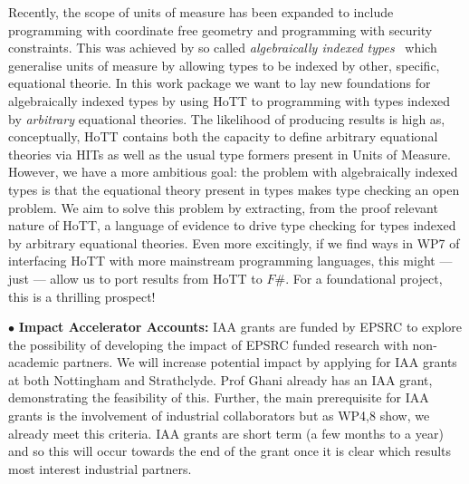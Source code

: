 \documentclass[a4paper,11pt]{article}
\begin{document}
Recently, the scope of units of measure has been expanded to include
programming with coordinate free geometry and programming with
security constraints. This was achieved by so called {\em
  algebraically indexed types}~\cite{ajk} which generalise units of
measure by allowing types to be indexed by other, specific, equational
theorie. In this work package we want to lay new foundations for
algebraically indexed types by using HoTT to programming with types
indexed by {\em arbitrary} equational theories. The likelihood of
producing results is high as, conceptually, HoTT contains both the
capacity to define arbitrary equational theories via HITs as well as
the usual type formers present in Units of Measure. However, we have a
more ambitious goal: the problem with algebraically indexed types is
that the equational theory present in types makes type checking an
open problem. We aim to solve this problem by extracting, from the proof
relevant nature of HoTT, a language of evidence to drive type checking
for types indexed by arbitrary equational theories. Even more
excitingly, if we find ways in WP7 of interfacing HoTT with more
mainstream programming languages, this might --- just --- allow us to port
results from HoTT to $F\#$.  For a foundational project, this is a
thrilling prospect!


\vspace*{0.02in}

$\bullet$ {\bf Impact Accelerator Accounts:} IAA grants are funded by
EPSRC to explore the possibility of
developing the impact of EPSRC funded research with non-academic
partners. We will increase potential impact 
by applying for IAA grants at both Nottingham and Strathclyde. Prof
Ghani already has an IAA grant, demonstrating the feasibility of
this. Further, the main prerequisite for IAA grants is the involvement 
of industrial collaborators but as WP4,8 show, we already meet this
criteria. IAA grants are short term (a few months to a year)
and so this will occur towards the end of the grant once it is clear
which results most interest industrial partners.

\vspace*{0.02in}
\end{document}
